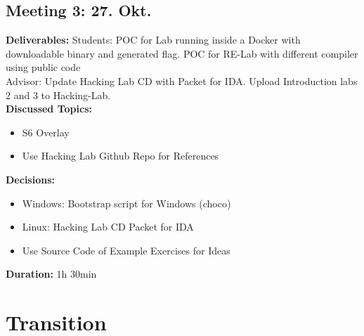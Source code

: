 \subsection*{Meeting 3: 27. Okt.}
\textbf{Deliverables:} Students: POC for Lab running inside a Docker with downloadable binary and generated flag. POC for RE-Lab with different compiler using public code \\ 
Advisor: Update Hacking Lab CD with Packet for IDA. Upload Introduction labs 2 and 3 to Hacking-Lab. \\
\textbf{Discussed Topics:} 
\begin{itemize}
    \item S6 Overlay
    \item Use Hacking Lab Github Repo for References
\end{itemize}
\textbf{Decisions:} 
\begin{itemize}
    \item Windows: Bootstrap script for Windows (choco)
    \item Linux: Hacking Lab CD Packet for IDA
    \item Use Source Code of Example Exercises for Ideas
\end{itemize}
\textbf{Duration:} 1h 30min


\section{Transition}
